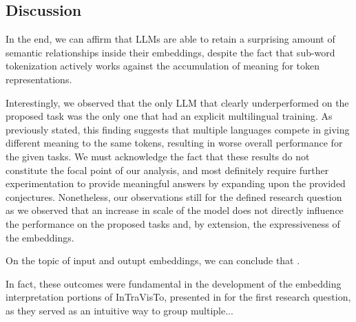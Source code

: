 
\subsection{Discussion}

In the end, we can affirm that LLMs are able to retain a surprising amount of semantic relationships inside their embeddings, despite the fact that sub-word tokenization actively works against the accumulation of meaning for token representations.

Interestingly, we observed that the only LLM that clearly underperformed on the proposed task was the only one that had an explicit multilingual training.
As previously stated, this finding suggests that multiple languages compete in giving different meaning to the same tokens, resulting in worse overall performance for the given tasks.
We must acknowledge the fact that these results do not constitute the focal point of our analysis, and most definitely require further experimentation to provide meaningful answers by expanding upon the provided conjectures.
Nonetheless, our observations still  for the defined research question as we observed that an increase in scale of the model does not directly influence the performance on the proposed tasks and, by extension, the expressiveness of the embeddings.

On the topic of input and outupt embeddings, we can conclude that .

In fact, these outcomes were fundamental in the development of the embedding interpretation portions of InTraVisTo, presented in  for the first research question, as they served as an intuitive way to group multiple...

